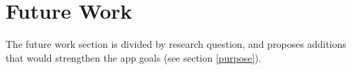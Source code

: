 \chapter{Future Work}\label{cha:future-work}


The future work section is divided by research question, and proposes additions that would strengthen the app goals (see section \ref{purpose}).







